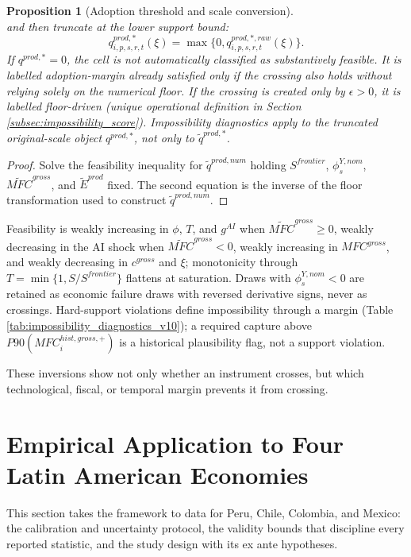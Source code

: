 \documentclass[11pt,a4paper]{article}
\newtheorem{proposition}{Proposition}
\begin{document}
\begin{proposition}[Adoption threshold and scale conversion]
\begin{equation}
\end{equation}
and then truncate at the lower support bound:
\begin{equation}\label{eq:q_star_truncated_v10}
    q^{prod,*}_{i,p,s,r,t}(\xi)=\max\{0,q^{prod,*,raw}_{i,p,s,r,t}(\xi)\}.
\end{equation}
If $q^{prod,*}=0$, the cell is not automatically classified as substantively feasible. It is labelled adoption-margin already satisfied only if the crossing also holds without relying solely on the numerical floor. If the crossing is created only by $\epsilon>0$, it is labelled floor-driven (unique operational definition in Section \ref{subsec:impossibility_score}). Impossibility diagnostics apply to the truncated original-scale object $q^{prod,*}$, not only to $\tilde q^{prod,*}$.
\end{proposition}

\begin{proof}
Solve the feasibility inequality for $\tilde q^{prod,num}$ holding $S^{frontier}$, $\phi^{Y,nom}_s$, $\widetilde{MFC}^{gross}$, and $\tilde E^{prod}$ fixed. The second equation is the inverse of the floor transformation used to construct $\tilde q^{prod,num}$.
\end{proof}
Feasibility is weakly increasing in $\phi$, $T$, and $g^{AI}$ when $\widetilde{MFC}^{gross}\geq0$, weakly decreasing in the AI shock when $\widetilde{MFC}^{gross}<0$, weakly increasing in $MFC^{gross}$, and weakly decreasing in $c^{gross}$ and $\xi$; monotonicity through $T=\min\{1,S/S^{frontier}\}$ flattens at saturation. Draws with $\phi^{Y,nom}_s<0$ are retained as economic failure draws with reversed derivative signs, never as crossings. Hard-support violations define impossibility through a margin (Table \ref{tab:impossibility_diagnostics_v10}); a required capture above $P90(MFC^{hist,gross,+}_i)$ is a historical plausibility flag, not a support violation.

These inversions show not only whether an instrument crosses, but which technological, fiscal, or temporal margin prevents it from crossing.

\section{Empirical Application to Four Latin American Economies}\label{sec:empirical_application}

This section takes the framework to data for Peru, Chile, Colombia, and Mexico: the calibration
and uncertainty protocol, the validity bounds that discipline every reported statistic, and the
study design with its ex ante hypotheses.
\end{document}
